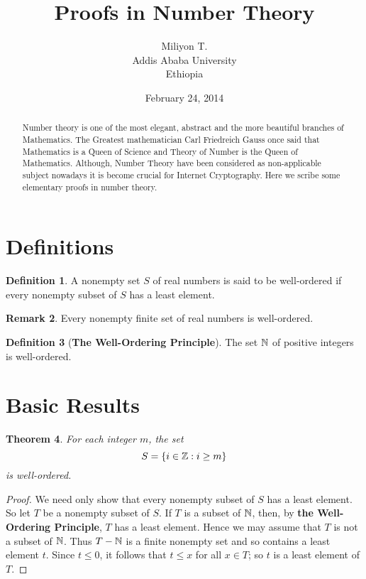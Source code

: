 \documentclass[12pt]{article}
\newtheorem{thm}{Theorem}[section]
\theoremstyle{definition}
\newtheorem{defn}[thm]{Definition}
\newtheorem{rem}[thm]{Remark}
\theoremstyle{plain}
\theoremstyle{remark}
\begin{document}
\title{Proofs in Number Theory}
\author{Miliyon T.\\
Addis Ababa University \\
Ethiopia}
\date{February 24, 2014}
\maketitle

\begin{abstract}
  Number theory is one of the most elegant, abstract and the more beautiful branches of Mathematics. The Greatest mathematician Carl Friedreich Gauss once said that Mathematics is a Queen of Science and Theory of Number is the Queen of Mathematics. Although, Number Theory have been considered as non-applicable subject nowadays it is become crucial for Internet Cryptography. Here we scribe some elementary proofs in number theory.
\end{abstract}

\section{Definitions}

\begin{defn}
A nonempty set $S$ of real numbers is said to be well-ordered if every nonempty subset of $S$ has a least element.
\end{defn}

\begin{rem}
Every nonempty finite set of real numbers is well-ordered.
\end{rem}

\begin{defn}[\textbf{The Well-Ordering Principle}]
The set $\Bbb N$ of positive integers is well-ordered.
\end{defn}
\section{Basic Results}
\begin{thm}\label{well-1}
For each integer $m$, the set
\[S=\{i\in\Bbb Z: i\geq m\}\]
is well-ordered.
\end{thm}
\begin{proof}
We need only show that every nonempty subset of $S$ has a least element. So let $T$ be a nonempty subset of $S$. If $T$ is a subset of $\Bbb N$, then, by \textbf{the Well-Ordering Principle}, $T$ has a least element. Hence we may assume that $T$ is not a subset of $\Bbb N$. Thus $T-\Bbb N$ is a finite nonempty set and so contains a least element $t$. Since $t\leq 0$, it follows that $t\leq x$ for all $x\in T$; so $t$ is a least element of $T$.
\end{proof}
\end{document}
